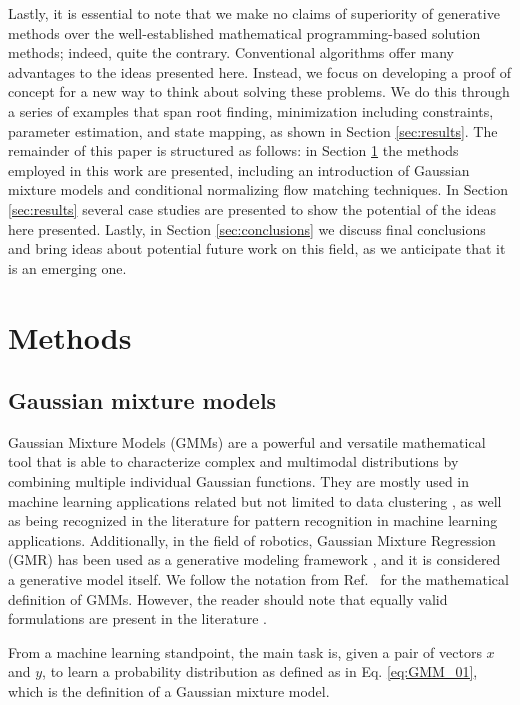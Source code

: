 \documentclass{achemso}
\begin{document}
Lastly, it is essential to note that we make no claims of superiority of generative methods over the well-established mathematical programming-based solution methods; indeed, quite the contrary. Conventional algorithms offer many advantages to the ideas presented here. Instead, we focus on developing a proof of concept for a new way to think about solving these problems. We do this through a series of examples that span root finding, minimization including constraints, parameter estimation, and state mapping, as shown in Section \ref{sec:results}. The remainder of this paper is structured as follows: in Section \ref{sec:methods} the methods employed in this work are presented, including an introduction of Gaussian mixture models and conditional normalizing flow matching techniques. In Section \ref{sec:results} several case studies are presented to show the potential of the ideas here presented. Lastly, in Section \ref{sec:conclusions} we discuss final conclusions and bring ideas about potential future work on this field, as we anticipate that it is an emerging one.


\section{Methods} \label{sec:methods}

\subsection{Gaussian mixture models}

Gaussian Mixture Models (GMMs) are a powerful and versatile mathematical tool that is able to characterize complex and multimodal distributions by combining multiple individual Gaussian functions. They are mostly used in machine learning applications related but not limited to data clustering \cite{Yang_2019_ICCV,viroli_deep_2019}, as well as being recognized in the literature for pattern recognition in machine learning \cite{bishop2006pattern} applications. Additionally, in the field of robotics, Gaussian Mixture Regression (GMR) has been used as a generative modeling framework  \cite{Fabisch2021}, and it is considered a generative model \cite{deisenroth2020mathematicsML} itself. We follow the notation from Ref.\  for the mathematical definition of GMMs. However, the reader should note that equally valid formulations are present in the literature \cite{deisenroth2020mathematicsML,bishop2006pattern}.

From a machine learning standpoint, the main task is, given a pair of vectors \(x\) and \(y\), to learn a probability distribution as defined as in Eq. \ref{eq:GMM_01}, which is the definition of a Gaussian mixture model.
\end{document}
